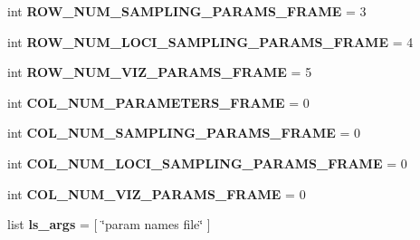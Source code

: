 \begin{DoxyCompactItemize}
\item 
int {\bfseries R\+O\+W\+\_\+\+N\+U\+M\+\_\+\+S\+A\+M\+P\+L\+I\+N\+G\+\_\+\+P\+A\+R\+A\+M\+S\+\_\+\+F\+R\+A\+ME} = 3\hypertarget{namespacenegui_1_1temp_a2772e27a618a468502084a01eec9b2e4}{}\label{namespacenegui_1_1temp_a2772e27a618a468502084a01eec9b2e4}

\item 
int {\bfseries R\+O\+W\+\_\+\+N\+U\+M\+\_\+\+L\+O\+C\+I\+\_\+\+S\+A\+M\+P\+L\+I\+N\+G\+\_\+\+P\+A\+R\+A\+M\+S\+\_\+\+F\+R\+A\+ME} = 4\hypertarget{namespacenegui_1_1temp_a084805f0da8c154e342a4b817801b6fb}{}\label{namespacenegui_1_1temp_a084805f0da8c154e342a4b817801b6fb}

\item 
int {\bfseries R\+O\+W\+\_\+\+N\+U\+M\+\_\+\+V\+I\+Z\+\_\+\+P\+A\+R\+A\+M\+S\+\_\+\+F\+R\+A\+ME} = 5\hypertarget{namespacenegui_1_1temp_a063841ce29408285a64bb98f3b54ca2e}{}\label{namespacenegui_1_1temp_a063841ce29408285a64bb98f3b54ca2e}

\item 
int {\bfseries C\+O\+L\+\_\+\+N\+U\+M\+\_\+\+P\+A\+R\+A\+M\+E\+T\+E\+R\+S\+\_\+\+F\+R\+A\+ME} = 0\hypertarget{namespacenegui_1_1temp_adce874743eba526ded5504e6e34f5b09}{}\label{namespacenegui_1_1temp_adce874743eba526ded5504e6e34f5b09}

\item 
int {\bfseries C\+O\+L\+\_\+\+N\+U\+M\+\_\+\+S\+A\+M\+P\+L\+I\+N\+G\+\_\+\+P\+A\+R\+A\+M\+S\+\_\+\+F\+R\+A\+ME} = 0\hypertarget{namespacenegui_1_1temp_adac2910f76b2efc1bf21148a847cca4d}{}\label{namespacenegui_1_1temp_adac2910f76b2efc1bf21148a847cca4d}

\item 
int {\bfseries C\+O\+L\+\_\+\+N\+U\+M\+\_\+\+L\+O\+C\+I\+\_\+\+S\+A\+M\+P\+L\+I\+N\+G\+\_\+\+P\+A\+R\+A\+M\+S\+\_\+\+F\+R\+A\+ME} = 0\hypertarget{namespacenegui_1_1temp_af800f095f746a1fdb45ba96abf60ab6f}{}\label{namespacenegui_1_1temp_af800f095f746a1fdb45ba96abf60ab6f}

\item 
int {\bfseries C\+O\+L\+\_\+\+N\+U\+M\+\_\+\+V\+I\+Z\+\_\+\+P\+A\+R\+A\+M\+S\+\_\+\+F\+R\+A\+ME} = 0\hypertarget{namespacenegui_1_1temp_a4728dbe3a315ac7985c7c8b392b2eb0d}{}\label{namespacenegui_1_1temp_a4728dbe3a315ac7985c7c8b392b2eb0d}

\item 
list {\bfseries ls\+\_\+args} = \mbox{[} \char`\"{}param names file\char`\"{} \mbox{]}\hypertarget{namespacenegui_1_1temp_ada2dab11b953ab9ecc964fdf60f73367}{}\label{namespacenegui_1_1temp_ada2dab11b953ab9ecc964fdf60f73367}


\end{DoxyCompactItemize}
